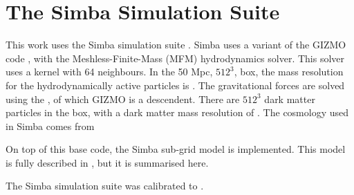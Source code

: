 \section{The Simba Simulation Suite}


This work uses the Simba simulation suite \citep{}. Simba uses a variant of the GIZMO code \citep{hopkins2015}, with the Meshless-Finite-Mass (MFM) hydrodynamics solver. This solver uses a  kernel with 64 neighbours. In the 50 Mpc, $512^3$, box, the mass resolution for the hydrodynamically active particles is . The gravitational forces are solved using the , of which GIZMO is a descendent. There are $512^3$ dark matter particles in the box, with a dark matter mass resolution of . The cosmology used in Simba comes from 

On top of this base code, the Simba sub-grid model is implemented. This model is fully described in \citet{}, but it is summarised here. 

The Simba simulation suite was calibrated to .


